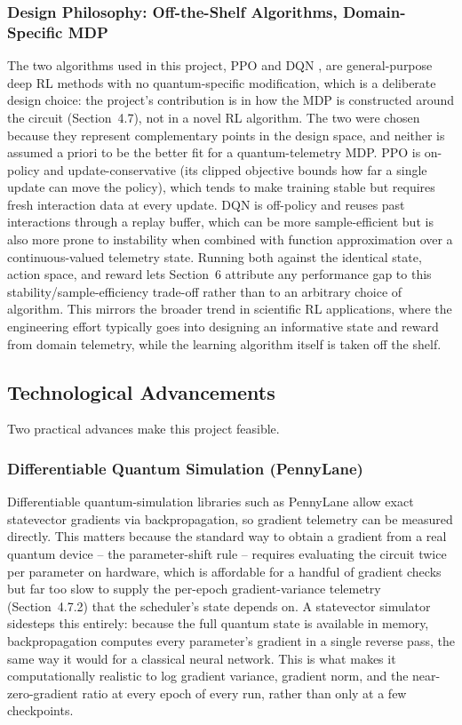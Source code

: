 \subsubsection{Design Philosophy: Off-the-Shelf Algorithms, Domain-Specific MDP}
The two algorithms used in this project, PPO \citep{schulman2017proximal} and DQN \citep{mnih2015human}, are general-purpose deep RL methods with no quantum-specific modification, which is a deliberate design choice: the project's contribution is in how the MDP is constructed around the circuit (Section~4.7), not in a novel RL algorithm. The two were chosen because they represent complementary points in the design space, and neither is assumed a priori to be the better fit for a quantum-telemetry MDP. PPO is on-policy and update-conservative (its clipped objective bounds how far a single update can move the policy), which tends to make training stable but requires fresh interaction data at every update. DQN is off-policy and reuses past interactions through a replay buffer, which can be more sample-efficient but is also more prone to instability when combined with function approximation over a continuous-valued telemetry state. Running both against the identical state, action space, and reward lets Section~6 attribute any performance gap to this stability/sample-efficiency trade-off rather than to an arbitrary choice of algorithm. This mirrors the broader trend in scientific RL applications, where the engineering effort typically goes into designing an informative state and reward from domain telemetry, while the learning algorithm itself is taken off the shelf.

\subsection{Technological Advancements}
Two practical advances make this project feasible.

\subsubsection{Differentiable Quantum Simulation (PennyLane)}
Differentiable quantum-simulation libraries such as PennyLane \citep{bergholm2018pennylane} allow exact statevector gradients via backpropagation, so gradient telemetry can be measured directly. This matters because the standard way to obtain a gradient from a real quantum device -- the parameter-shift rule -- requires evaluating the circuit twice per parameter on hardware, which is affordable for a handful of gradient checks but far too slow to supply the per-epoch gradient-variance telemetry (Section~4.7.2) that the scheduler's state depends on. A statevector simulator sidesteps this entirely: because the full quantum state is available in memory, backpropagation computes every parameter's gradient in a single reverse pass, the same way it would for a classical neural network. This is what makes it computationally realistic to log gradient variance, gradient norm, and the near-zero-gradient ratio at every epoch of every run, rather than only at a few checkpoints.

